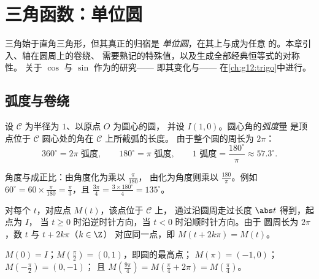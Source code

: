 \chapter{三角函数：单位圆}\label{ch:g11:trigo}

三角始于直角三角形，但其真正的归宿是
\emph{单位圆}，在其上与成为任意
的。本章引入、轴在圆周上的卷绕、
需要熟记的特殊值，以及生成全部经典恒等式的对称性。
关于 $\cos$ 与 $\sin$ 作为的研究——
即其变化与——
在\cref{ch:g12:trigo}中进行。

\section{弧度与卷绕}

\begin{definition}[弧度]\label{def:g11:trigo:radian}
设 $\mathcal C$ 为半径为 $1$、以原点 $O$ 为圆心的圆，
并设 $I(1, 0)$。圆心角的\emph{弧度}量
是顶点位于 $\mathcal C$ 圆心处的角在 $\mathcal C$ 上所截弧的长度。
由于整个圆的周长为 $2\pi$：
\[
360^\circ = 2\pi \text{ 弧度},
\qquad
180^\circ = \pi \text{ 弧度},
\qquad
1 \text{ 弧度} = \frac{180^\circ}{\pi} \approx 57.3^\circ .
\]
\end{definition}

\begin{method}[换算]\label{met:g11:trigo:convert}
角度与成正比：由角度化为乘以 $\frac{\pi}{180}$，
由化为角度则乘以 $\frac{180}{\pi}$。例如
$60^\circ = 60 \times \frac{\pi}{180} = \frac{\pi}{3}$，且
$\frac{3\pi}{4} = \frac{3 \times 180^\circ}{4} = 135^\circ$。
\end{method}

\begin{definition}[实数轴在圆上的卷绕]\label{def:g11:trigo:winding}
对每个 $t$，对应点 $M(t)$，该点位于 $\mathcal C$ 上，
通过沿圆周走过长度 $\abs t$ 得到，起点为 $I$，
当 $t \geq 0$ 时沿逆时针方向，当 $t < 0$ 时沿顺时针方向。由于
圆周长为 $2\pi$，数 $t$ 与 $t + 2k\pi$（$k \in \Z$）
对应同一点，即 $M(t + 2k\pi) = M(t)$。
\end{definition}

\begin{example}
$M(0) = I$；$M\!\left(\frac{\pi}{2}\right) = (0, 1)$，即圆的最高点；
$M(\pi) = (-1, 0)$；$M\!\left(-\frac{\pi}{2}\right) = (0, -1)$；
且 $M\!\left(\frac{9\pi}{4}\right) = M\!\left(\frac{\pi}{4} +
2\pi\right) = M\!\left(\frac{\pi}{4}\right)$。
\end{example}

